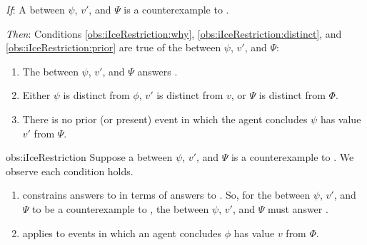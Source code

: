 \begin{note}
    \begin{observation}%
    \label{obs:iIceRestriction}%
    \vspace{-\baselineskip}
    \begin{itenum}
    \item[\emph{If}:]
      A \ros{} between \(\psi\), \(v'\), and \(\Psi\) is a counterexample to \issueInclusion{}.
    \item[\emph{Then}:]
      Conditions \ref{obs:iIceRestriction:why}, \ref{obs:iIceRestriction:distinct}, and \ref{obs:iIceRestriction:prior} are true of the \ros{} between \(\psi\), \(v'\), and \(\Psi\):
      \begin{enumerate}[label=\arabic*., ref=\arabic*]
      \item
        \label{obs:iIceRestriction:why}
        The \ros{} between \(\psi\), \(v'\), and \(\Psi\) answers \qWhy{}.
      \item
        \label{obs:iIceRestriction:distinct}
        Either \(\psi\) is distinct from \(\phi\), \(v'\) is distinct from \(v\), or \(\Psi\) is distinct from \(\Phi\).
      \item
        \label{obs:iIceRestriction:prior}
        There is no prior (or present) event in which the agent concludes \(\psi\) has value \(v'\) from \(\Psi\).
      \end{enumerate}
    \end{itenum}
    \vspace{-1.5\baselineskip}
  \end{observation}
  \begin{motivation}{obs:iIceRestriction}
    Suppose a \ros{} between \(\psi\), \(v'\), and \(\Psi\) is a counterexample to \issueInclusion{}.
    We observe each condition holds.

    \begin{enumerate}
    \item
      \issueInclusion{} constrains answers to \qWhy{} in terms of answers to \qHow{}.
    So, for the \ros{} between \(\psi\), \(v'\), and \(\Psi\) to be a counterexample to \issueInclusion{}, the \ros{} between \(\psi\), \(v'\), and \(\Psi\) must answer \qWhy{}.
  \item
    \qWhy{} applies to events in which an agent concludes \(\phi\) has value \(v\) from \(\Phi\).


\end{enumerate}
\end{motivation}
\end{note}
